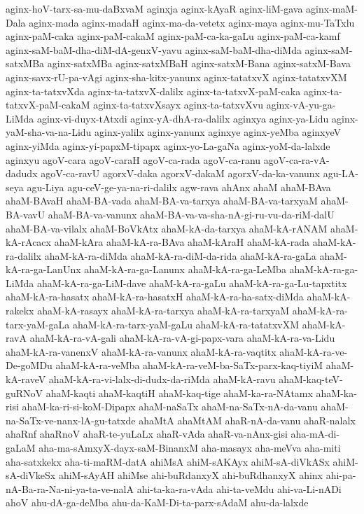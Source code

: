 {aginx-hoV-tarx-sa-mu-daBxvaM
aginxja
aginx-kAyaR
aginx-liM-gava
aginx-maM-Dala
aginx-mada
aginx-madaH
aginx-ma-da-vetetx
aginx-maya
aginx-mu-TaTxlu
aginx-paM-caka
aginx-paM-cakaM
aginx-paM-ca-ka-gaLu
aginx-paM-ca-kamf
aginx-saM-baM-dha-diM-dA-genxV-yavu
aginx-saM-baM-dha-diMda
aginx-saM-satxMBa
aginx-satxMBa
aginx-satxMBaH
aginx-satxM-Bana
aginx-satxM-Bava
aginx-savx-rU-pa-vAgi
aginx-sha-kitx-yanunx
aginx-tatatxvX
aginx-tatatxvXM
aginx-ta-tatxvXda
aginx-ta-tatxvX-dalilx
aginx-ta-tatxvX-paM-caka
aginx-ta-tatxvX-paM-cakaM
aginx-ta-tatxvXsayx
aginx-ta-tatxvXvu
aginx-vA-yu-ga-LiMda
aginx-vi-duyx-tAtxdi
aginx-yA-dhA-ra-dalilx
aginxya
aginx-ya-Lidu
aginx-yaM-sha-va-na-Lidu
aginx-yalilx
aginx-yanunx
aginxye
aginx-yeMba
aginxyeV
aginx-yiMda
aginx-yi-papxM-tipapx
aginx-yo-La-gaNa
aginx-yoM-da-lalxde
aginxyu
agoV-cara
agoV-caraH
agoV-ca-rada
agoV-ca-ranu
agoV-ca-ra-vA-dadudx
agoV-ca-ravU
agorxV-daka
agorxV-dakaM
agorxV-da-ka-vanunx
agu-LA-seya
agu-Liya
agu-ceV-ge-ya-na-ri-dalilx
agw-rava
ahAnx
ahaM
ahaM-BAva
ahaM-BAvaH
ahaM-BA-vada
ahaM-BA-va-tarxya
ahaM-BA-va-tarxyaM
ahaM-BA-vavU
ahaM-BA-va-vanunx
ahaM-BA-va-va-sha-nA-gi-ru-vu-da-riM-dalU
ahaM-BA-va-vilalx
ahaM-BoVkAtx
ahaM-kA-da-tarxya
ahaM-kA-rANAM
ahaM-kA-rAcacx
ahaM-kAra
ahaM-kA-ra-BAva
ahaM-kAraH
ahaM-kA-rada
ahaM-kA-ra-dalilx
ahaM-kA-ra-diMda
ahaM-kA-ra-diM-da-rida
ahaM-kA-ra-gaLa
ahaM-kA-ra-ga-LanUnx
ahaM-kA-ra-ga-Lanunx
ahaM-kA-ra-ga-LeMba
ahaM-kA-ra-ga-LiMda
ahaM-kA-ra-ga-LiM-dave
ahaM-kA-ra-gaLu
ahaM-kA-ra-ga-Lu-tapxtitx
ahaM-kA-ra-hasatx
ahaM-kA-ra-hasatxH
ahaM-kA-ra-ha-satx-diMda
ahaM-kA-rakekx
ahaM-kA-rasayx
ahaM-kA-ra-tarxya
ahaM-kA-ra-tarxyaM
ahaM-kA-ra-tarx-yaM-gaLa
ahaM-kA-ra-tarx-yaM-gaLu
ahaM-kA-ra-tatatxvXM
ahaM-kA-ravA
ahaM-kA-ra-vA-gali
ahaM-kA-ra-vA-gi-papx-vara
ahaM-kA-ra-va-Lidu
ahaM-kA-ra-vanenxV
ahaM-kA-ra-vanunx
ahaM-kA-ra-vaqtitx
ahaM-kA-ra-ve-De-goMDu
ahaM-kA-ra-veMba
ahaM-kA-ra-veM-ba-SaTx-parx-kaq-tiyiM
ahaM-kA-raveV
ahaM-kA-ra-vi-lalx-di-dudx-da-riMda
ahaM-kA-ravu
ahaM-kaq-teV-guRNoV
ahaM-kaqti
ahaM-kaqtiH
ahaM-kaq-tige
ahaM-ka-ra-NAtamx
ahaM-ka-risi
ahaM-ka-ri-si-koM-Dipapx
ahaM-naSaTx
ahaM-na-SaTx-nA-da-vanu
ahaM-na-SaTx-ve-nanx-lA-gu-tatxde
ahaMtA
ahaMtAM
ahaR-nA-da-vanu
ahaR-nalalx
ahaRnf
ahaRnoV
ahaR-te-yuLaLx
ahaR-vAda
ahaR-va-nAnx-gisi
aha-mA-di-gaLaM
aha-ma-sAmxyX-dayx-saM-BinanxM
aha-masayx
aha-meVva
aha-miti
aha-satxkekx
aha-ti-maRM-datA
ahiMsA
ahiM-sAKAyx
ahiM-sA-diVkASx
ahiM-sA-diVkeSx
ahiM-sAyAH
ahiMse
ahi-buRdanxyX
ahi-buRdhanxyX
ahinx
ahi-pa-nA-Ba-ra-Na-ni-ya-ta-ve-nalA
ahi-ta-ka-ra-vAda
ahi-ta-veMdu
ahi-va-Li-nADi
ahoV
ahu-dA-ga-deMba
ahu-da-KaM-Di-ta-parx-sAdaM
ahu-da-lalxde
}
